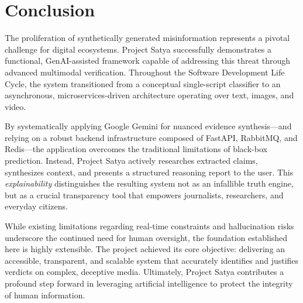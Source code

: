 \chapter{Conclusion}

The proliferation of synthetically generated misinformation represents a pivotal challenge for digital ecosystems. Project Satya successfully demonstrates a functional, GenAI-assisted framework capable of addressing this threat through advanced multimodal verification. Throughout the Software Development Life Cycle, the system transitioned from a conceptual single-script classifier to an asynchronous, microservices-driven architecture operating over text, images, and video.

By systematically applying Google Gemini for nuanced evidence synthesis—and relying on a robust backend infrastructure composed of FastAPI, RabbitMQ, and Redis—the application overcomes the traditional limitations of black-box prediction. Instead, Project Satya actively researches extracted claims, synthesizes context, and presents a structured reasoning report to the user. This \textit{explainability} distinguishes the resulting system not as an infallible truth engine, but as a crucial transparency tool that empowers journalists, researchers, and everyday citizens.

While existing limitations regarding real-time constraints and hallucination risks underscore the continued need for human oversight, the foundation established here is highly extensible. The project achieved its core objective: delivering an accessible, transparent, and scalable system that accurately identifies and justifies verdicts on complex, deceptive media. Ultimately, Project Satya contributes a profound step forward in leveraging artificial intelligence to protect the integrity of human information.
